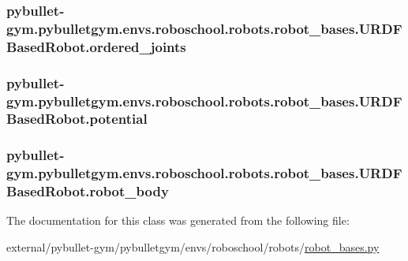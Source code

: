 \subsubsection[{\texorpdfstring{ordered\+\_\+joints}{ordered_joints}}]{\setlength{\rightskip}{0pt plus 5cm}pybullet-\/gym.\+pybulletgym.\+envs.\+roboschool.\+robots.\+robot\+\_\+bases.\+U\+R\+D\+F\+Based\+Robot.\+ordered\+\_\+joints}\hypertarget{classpybullet-gym_1_1pybulletgym_1_1envs_1_1roboschool_1_1robots_1_1robot__bases_1_1_u_r_d_f_based_robot_a92093cdb55133045101194cc38f308e9}{}\label{classpybullet-gym_1_1pybulletgym_1_1envs_1_1roboschool_1_1robots_1_1robot__bases_1_1_u_r_d_f_based_robot_a92093cdb55133045101194cc38f308e9}
\subsubsection[{\texorpdfstring{potential}{potential}}]{\setlength{\rightskip}{0pt plus 5cm}pybullet-\/gym.\+pybulletgym.\+envs.\+roboschool.\+robots.\+robot\+\_\+bases.\+U\+R\+D\+F\+Based\+Robot.\+potential}\hypertarget{classpybullet-gym_1_1pybulletgym_1_1envs_1_1roboschool_1_1robots_1_1robot__bases_1_1_u_r_d_f_based_robot_aa062ed4fd268ae75b0dc1cb400e5a37b}{}\label{classpybullet-gym_1_1pybulletgym_1_1envs_1_1roboschool_1_1robots_1_1robot__bases_1_1_u_r_d_f_based_robot_aa062ed4fd268ae75b0dc1cb400e5a37b}
\subsubsection[{\texorpdfstring{robot\+\_\+body}{robot_body}}]{\setlength{\rightskip}{0pt plus 5cm}pybullet-\/gym.\+pybulletgym.\+envs.\+roboschool.\+robots.\+robot\+\_\+bases.\+U\+R\+D\+F\+Based\+Robot.\+robot\+\_\+body}\hypertarget{classpybullet-gym_1_1pybulletgym_1_1envs_1_1roboschool_1_1robots_1_1robot__bases_1_1_u_r_d_f_based_robot_a0dd8c02b3be5c043998bafc69d4c1715}{}\label{classpybullet-gym_1_1pybulletgym_1_1envs_1_1roboschool_1_1robots_1_1robot__bases_1_1_u_r_d_f_based_robot_a0dd8c02b3be5c043998bafc69d4c1715}


The documentation for this class was generated from the following file\+:\begin{DoxyCompactItemize}
\item 
external/pybullet-\/gym/pybulletgym/envs/roboschool/robots/\hyperlink{roboschool_2robots_2robot__bases_8py}{robot\+\_\+bases.\+py}\end{DoxyCompactItemize}
